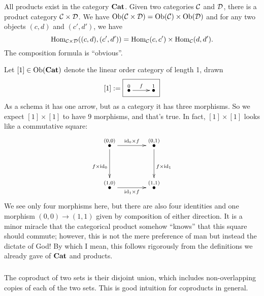 \begin{example}\label{ex:[1]x[1]}

All products exist in the category ${\bf Cat}$. Given two categories $\mathcal{C}$ and $\mathcal{D}$, there is a product category $\mathcal{C}\times\mathcal{D}$. We have $\textnormal{Ob}(\mathcal{C}\times\mathcal{D})=\textnormal{Ob}(\mathcal{C})\times\textnormal{Ob}(\mathcal{D})$ and for any two objects $(c,d)$ and $(c',d')$, we have $$\textnormal{Hom}_{\mathcal{C}\times\mathcal{D}}((c,d),(c',d'))=\textnormal{Hom}_\mathcal{C}(c,c')\times\textnormal{Hom}_\mathcal{C}(d,d').$$ The composition formula is “obvious”.

Let $[1]\in\textnormal{Ob}({\bf Cat})$ denote the linear order category of length 1, drawn $$[1]:=\fbox{\xymatrix{\LMO{0}\ar[r]^f&\LMO{1}}}$$ As a schema it has one arrow, but as a category it has three morphisms. So we expect $[1]\times[1]$ to have 9 morphisms, and that's true. In fact, $[1]\times[1]$ looks like a commutative square:
\begin{align}\label{dia:comm square}
\xymatrix@=40pt{
\LMO{(0,0)}\ar[r]^{\id_0\times f}\ar[d]_{f\times\id_0}&\LMO{(0,1)}\ar[d]^{f\times\id_1}\\
\LMO{(1,0)}\ar[r]_{\id_1\times f}&\LMO{(1,1)}}
\end{align}
We see only four morphisms here, but there are also four identities and one morphism $(0,0)\to(1,1)$ given by composition of either direction. It is a minor miracle that the categorical product somehow “knows” that this square should commute; however, this is not the mere preference of man but instead the dictate of God! By which I mean, this follows rigorously from the definitions we already gave of ${\bf Cat}$ and products.

\end{example}


\subsubsection{}

The coproduct of two sets is their disjoint union, which includes non-overlapping copies of each of the two sets. This is good intuition for coproducts in general.

